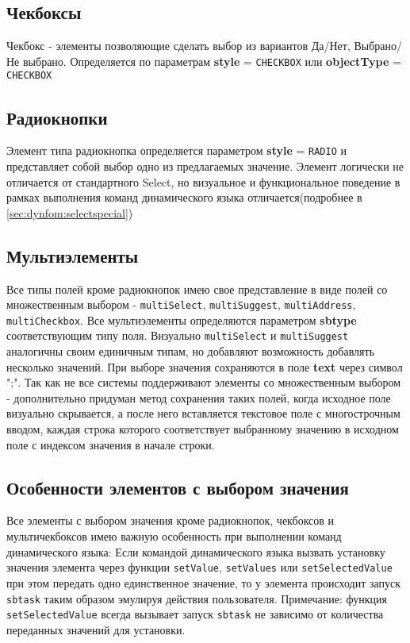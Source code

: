 \documentclass[../index.tex]{subfiles}
\begin{document}
\subsection{Чекбоксы}
    Чекбокс - элементы позволяющие сделать выбор из вариантов Да/Нет, Выбрано/Не выбрано.
    Определяется по параметрам \textbf{style} = \verb|CHECKBOX| или \textbf{objectType} = \verb|CHECKBOX|
\subsection{Радиокнопки}
    Элемент типа радиокнопка определяется параметром \textbf{style} = \verb|RADIO| и представляет собой выбор одно из предлагаемых значение.
    Элемент логически не отличается от стандартного Select, но визуальное и функциональное поведение в рамках выполнения команд динамического языка отличается(подробнее в \autoref{sec:dynfom:selectspecial})
\subsection{Мультиэлементы}
    Все типы полей кроме радиокнопок имею свое представление в виде полей со множественным выбором -  \verb|multiSelect|, \verb|multiSuggest|, \verb|multiAddress|, \verb|multiCheckbox|.
    Все мультиэлементы определяются параметром \textbf{sbtype} соответствующим типу поля. Визуально \verb|multiSelect| и \verb|multiSuggest| аналогичны своим единичным типам, но добавляют возможность добавлять несколько значений.
    При выборе значения сохраняются в поле \textbf{text} через символ ";". Так как не все системы поддерживают элементы со множественным выбором - дополнительно придуман метод сохранения таких полей, когда исходное поле визуально скрывается, а после него вставляется текстовое поле с многострочным вводом, каждая строка которого соответствует выбранному значению в исходном поле с индексом значения в начале строки.
\subsection{Особенности элементов с выбором значения}\label{sec:dynfom:selectspecial} 
    Все элементы с выбором значения кроме радиокнопок, чекбоксов и мультичекбоксов имею важную особенность при выполнении команд динамического языка: Если командой динамического языка вызвать установку значения элемента через функции \verb|setValue|, \verb|setValues| или \verb|setSelectedValue| при этом передать одно единственное значение, то у элемента происходит запуск \verb|sbtask| таким образом эмулируя действия пользователя.
    Примечание: функция \verb|setSelectedValue| всегда вызывает запуск \verb|sbtask| не зависимо от количества переданных значений для установки.
\end{document}
